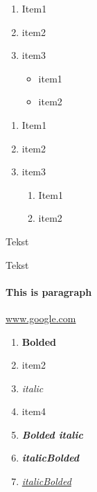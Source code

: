 \documentclass{report}
\begin{document}
    \begin{enumerate}
        \item Item1
        \item item2 
        \item item3 
            \begin{itemize}
                \item item1
                \item item2
            \end{itemize}
    \end{enumerate}
    \begin{enumerate}
        \item Item1
        \item item2
        \item item3 \begin{enumerate}
                \item Item1
                \item item2
            \end{enumerate}
    \end{enumerate}

    Tekst

    Tekst



    \paragraph{This is paragraph}
    \url{www.google.com}

    \begin{enumerate}
        \item \textbf{Bolded}
        \item item2
        \item \textit{italic}
        \item item4
        \item \textbf{\textit{Bolded italic}}
        \item \textit{\textbf{italicBolded}}
        \item \textit{\underline{italicBolded}}
    \end{enumerate}
\end{document}
